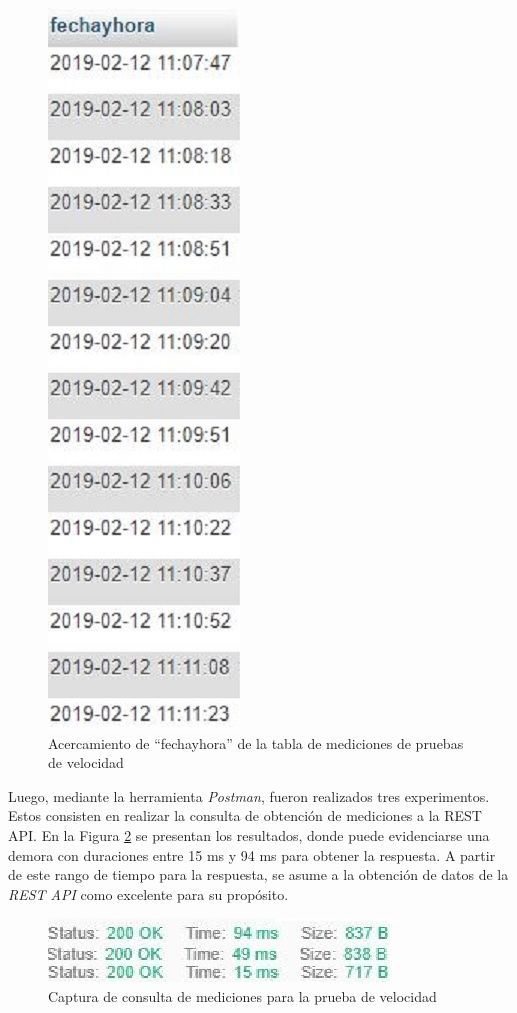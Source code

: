 \begin{figure}[H]
    \centering
    \includegraphics[scale=0.5]{Pruebas/InsercionesZOOM.jpg}
    \caption{Acercamiento de ``fechayhora'' de la tabla de mediciones de pruebas de velocidad}
    \label{fig:pruebasdeInsercionFechayHora}
\end{figure}
\par
Luego, mediante la herramienta \textit{Postman}, fueron realizados tres experimentos. Estos consisten en realizar la consulta de obtención de mediciones a la REST API. En la Figura \ref{fig:pruebasdeConsulta} se presentan los resultados, donde puede evidenciarse una demora con duraciones entre 15 ms y 94 ms para obtener la respuesta. A partir de este rango de tiempo para la respuesta, se asume a la obtención de datos de la \textit{REST API} como excelente para su propósito.
\begin{figure}[h]
    \centering
    \includegraphics[scale=1]{Pruebas/postman3en1b.jpg}
    \caption{Captura de consulta de mediciones para la prueba de velocidad}
    \label{fig:pruebasdeConsulta}
\end{figure}


